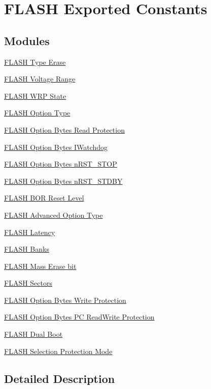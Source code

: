 \hypertarget{group___f_l_a_s_h_ex___exported___constants}{}\section{F\+L\+A\+SH Exported Constants}
\label{group___f_l_a_s_h_ex___exported___constants}
\subsection*{Modules}
\begin{DoxyCompactItemize}
\item 
\hyperlink{group___f_l_a_s_h_ex___type___erase}{F\+L\+A\+S\+H Type Erase}
\item 
\hyperlink{group___f_l_a_s_h_ex___voltage___range}{F\+L\+A\+S\+H Voltage Range}
\item 
\hyperlink{group___f_l_a_s_h_ex___w_r_p___state}{F\+L\+A\+S\+H W\+R\+P State}
\item 
\hyperlink{group___f_l_a_s_h_ex___option___type}{F\+L\+A\+S\+H Option Type}
\item 
\hyperlink{group___f_l_a_s_h_ex___option___bytes___read___protection}{F\+L\+A\+S\+H Option Bytes Read Protection}
\item 
\hyperlink{group___f_l_a_s_h_ex___option___bytes___i_watchdog}{F\+L\+A\+S\+H Option Bytes I\+Watchdog}
\item 
\hyperlink{group___f_l_a_s_h_ex___option___bytes__n_r_s_t___s_t_o_p}{F\+L\+A\+S\+H Option Bytes n\+R\+S\+T\+\_\+\+S\+T\+OP}
\item 
\hyperlink{group___f_l_a_s_h_ex___option___bytes__n_r_s_t___s_t_d_b_y}{F\+L\+A\+S\+H Option Bytes n\+R\+S\+T\+\_\+\+S\+T\+D\+BY}
\item 
\hyperlink{group___f_l_a_s_h_ex___b_o_r___reset___level}{F\+L\+A\+S\+H B\+O\+R Reset Level}
\item 
\hyperlink{group___f_l_a_s_h_ex___advanced___option___type}{F\+L\+A\+S\+H Advanced Option Type}
\item 
\hyperlink{group___f_l_a_s_h___latency}{F\+L\+A\+S\+H Latency}
\item 
\hyperlink{group___f_l_a_s_h_ex___banks}{F\+L\+A\+S\+H Banks}
\item 
\hyperlink{group___f_l_a_s_h_ex___mass_erase__bit}{F\+L\+A\+S\+H Mass Erase bit}
\item 
\hyperlink{group___f_l_a_s_h_ex___sectors}{F\+L\+A\+S\+H Sectors}
\item 
\hyperlink{group___f_l_a_s_h_ex___option___bytes___write___protection}{F\+L\+A\+S\+H Option Bytes Write Protection}
\item 
\hyperlink{group___f_l_a_s_h_ex___option___bytes___p_c___read_write___protection}{F\+L\+A\+S\+H Option Bytes P\+C Read\+Write Protection}
\item 
\hyperlink{group___f_l_a_s_h_ex___dual___boot}{F\+L\+A\+S\+H Dual Boot}
\item 
\hyperlink{group___f_l_a_s_h_ex___selection___protection___mode}{F\+L\+A\+S\+H Selection Protection Mode}
\end{DoxyCompactItemize}


\subsection{Detailed Description}
